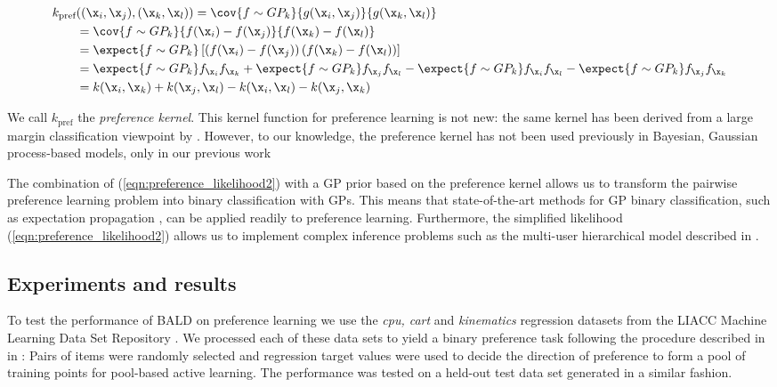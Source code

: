 \begin{align}
	k_\text{pref}&((\x_i,\x_j),(\x_k,\x_l)) = \cov{f\sim GP_k}{g(\x_i,\x_j)}{g(\x_k,\x_l)}\\
	&= \cov{f\sim GP_k}{f(\x_i)-f(\x_j)}{f(\x_k) - f(\x_l)}\\
	&= \expect{f\sim GP_k}\left[\left(f(\x_i)-f(\x_j)\right)\left(f(\x_k)-f(\x_l)\right)\right]\\
	&= \expect{f\sim GP_k}f_{\x_i}f_{\x_k} + \expect{f\sim GP_k}f_{\x_j}f_{\x_l} - \expect{f\sim GP_k}f_{\x_i}f_{\x_l} - \expect{f\sim GP_k}f_{\x_j}f_{\x_k}\\
	&= k(\x_i,\x_k) + k(\x_j,\x_l) - k(\x_i,\x_l) - k(\x_j,\x_k) \label{eqn:preference_kernel}
\end{align}

We call $k_\text{pref}$ the \emph{preference kernel}. This kernel function for preference learning is not new: the same kernel has been derived from a large margin classification viewpoint by \citet{furnkranz2010}. However, to our knowledge, the preference kernel has not been used previously in Bayesian, Gaussian process-based models, only in our previous work \citep{Houlsby2011,Houlsby2012preference}

The combination of (\ref{eqn:preference_likelihood2}) with a GP prior based on the preference kernel allows us to transform the pairwise preference learning problem into  binary classification with GPs. This means that state-of-the-art methods for GP binary classification, such as expectation propagation \citep{Minka2001}, can be applied readily to preference learning. Furthermore, the simplified likelihood (\ref{eqn:preference_likelihood2}) allows us to implement complex inference problems such as the multi-user hierarchical model described in \citep{Houlsby2012preference}.

\subsection{Experiments and results}

To test the performance of BALD on preference learning we use the \emph{cpu, cart} and \emph{kinematics} regression datasets from the LIACC Machine Learning Data Set Repository \citep{LIACCRepository}. We processed each of these data sets to yield a binary preference task following the procedure described in in \cite{Chu2005}: Pairs of items were randomly selected and regression target values were used to decide the direction of preference to form a pool of training points for pool-based active learning. The performance was tested on a held-out test data set generated in a similar fashion.

